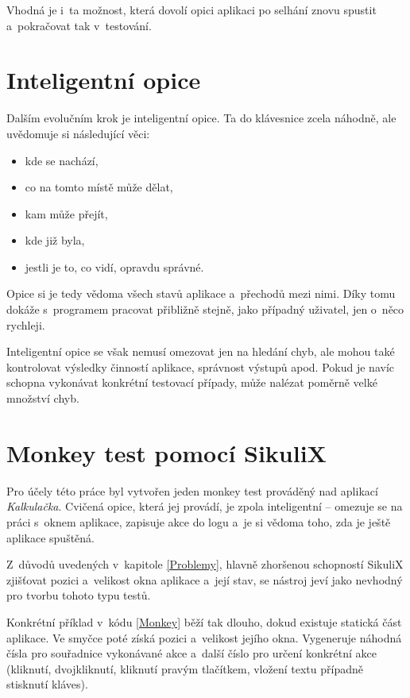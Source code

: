 	Vhodná je i~ta možnost, která dovolí opici aplikaci po selhání znovu spustit a~pokračovat tak v~testování.
	
	\section{Inteligentní opice}
	Dalším evolučním krok je inteligentní opice. Ta do klávesnice  zcela náhodně, ale uvědomuje si následující věci:
		\begin{itemize}
			\item kde se nachází,
			\item co na tomto místě může dělat,
			\item kam může přejít,
			\item kde již byla,
			\item jestli je to, co vidí, opravdu správné.
		\end{itemize}
	Opice si je tedy vědoma všech stavů aplikace a~přechodů mezi nimi. Díky tomu dokáže s~programem pracovat přibližně stejně, jako případný uživatel, jen o~něco rychleji.
	
	Inteligentní opice se však nemusí omezovat jen na hledání chyb, ale mohou také kontrolovat výsledky činností aplikace, správnost výstupů apod. Pokud je navíc schopna vykonávat konkrétní testovací případy, může nalézat poměrně velké množství chyb.
	
	\section{Monkey test pomocí SikuliX}
	Pro účely této práce byl vytvořen jeden monkey test prováděný nad aplikací \emph{Kalkulačka}. Cvičená opice, která jej provádí, je zpola inteligentní -- omezuje se na práci s~oknem aplikace, zapisuje akce do logu a~je si vědoma toho, zda je ještě aplikace spuštěná.
	
	Z~důvodů uvedených v~kapitole \ref{Problemy}, hlavně zhoršenou schopností SikuliX zjišťovat pozici a~velikost okna aplikace a~její stav, se nástroj jeví jako nevhodný pro tvorbu tohoto typu testů.
	
	Konkrétní příklad v~kódu \ref{Monkey} běží tak dlouho, dokud existuje statická část aplikace. Ve smyčce poté získá pozici a~velikost jejího okna. Vygeneruje náhodná čísla pro souřadnice vykonávané akce a~další číslo pro určení konkrétní akce (kliknutí, dvojkliknutí, kliknutí pravým tlačítkem, vložení textu případně stisknutí kláves). 
	
	